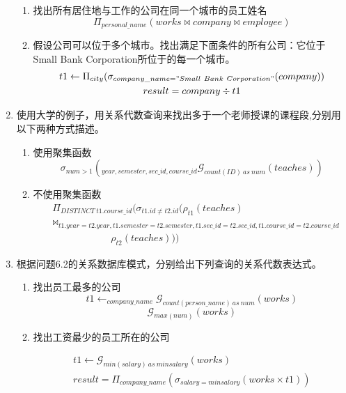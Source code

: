 \documentclass{dingjia}
\begin{document}
\begin{enumerate}
\begin{enumerate}
  \item 找出所有居住地与工作的公司在同一个城市的员工姓名
    \[\Pi_{personal\_name}(works \bowtie company \bowtie employee)\]

  \item 假设公司可以位于多个城市。找出满足下面条件的所有公司：它位于
    Small Bank Corporation所位于的每一个城市。
    \begin{gather*}
      t1  \leftarrow \Pi_{city}(\sigma_{company\_name = "Small\ Bank\ Corporation"}(company))\\
      result = company \div t1
    \end{gather*}

  \end{enumerate}

\item 使用大学的例子，用关系代数查询来找出多于一个老师授课的课程段,分别用
  以下两种方式描述。
  \begin{enumerate}
  \item 使用聚集函数
    \[ \sigma_{num > 1}(_{year, semester, sec\_id, course\_id}\mathcal{G}_{count(ID)\ as\ num}(teaches)) \]

  \item 不使用聚集函数
    \begin{align*}
      &\Pi_{DISTINCT\ t1.course\_id}(\sigma_{t1.id  \not = t2.id}(\rho_{t1}(teaches) \\
      & \bowtie_{t1.year = t2.year,  t1.semester = t2.semester, t1.sec\_id = t2.sec\_id, t1.course\_id = t2.course\_id} \\
      & \qquad \qquad \qquad \rho_{t2}(teaches)))
    \end{align*}
  \end{enumerate}

\item 根据问题6.2的关系数据库模式，分别给出下列查询的关系代数表达式。

  \begin{enumerate}
  \item 找出员工最多的公司
    \[t1 \leftarrow _{company\_name}\mathcal{G}_{count(person\_name)\ as\ num}(works)\]
    \[\mathcal{G}_{max(num)}(works)\]

  \item 找出工资最少的员工所在的公司

    \begin{gather*}
      t1 \leftarrow \mathcal{G}_{min(salary)\ as\ minsalary}(works) \\
      result = \Pi_{company\_name}(\sigma_{salary = minsalary}(works \times t1))
    \end{gather*}


\end{enumerate}
\end{enumerate}
\end{document}
